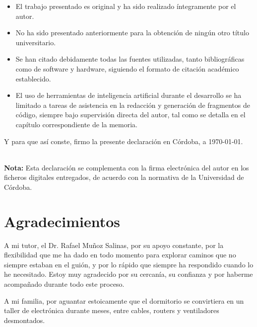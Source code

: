 \documentclass[12pt, a4paper, twoside, openright]{report}
\begin{document}
\begin{itemize}
    \item El trabajo presentado es original y ha sido realizado íntegramente por el autor.
    \item No ha sido presentado anteriormente para la obtención de ningún otro título universitario.
    \item Se han citado debidamente todas las fuentes utilizadas, tanto bibliográficas como de software y hardware, siguiendo el formato de citación académico establecido.
    \item El uso de herramientas de inteligencia artificial durante el desarrollo se ha limitado a tareas de asistencia en la redacción y generación de fragmentos de código, siempre bajo supervisión directa del autor, tal como se detalla en el capítulo correspondiente de la memoria.
\end{itemize}

\vspace{1.5cm}

\noindent Y para que así conste, firmo la presente declaración en Córdoba, a \today.\\[2cm]

\noindent\makebox[6cm]{\hrulefill}\\
\hspace*{0.5cm}{\footnotesize Fdo.: Jesús Fernández López}

\vspace{1cm}

\noindent\textbf{Nota:} Esta declaración se complementa con la firma electrónica del autor en los ficheros digitales entregados, de acuerdo con la normativa de la Universidad de Córdoba.

\cleardoublepage

\chapter*{Agradecimientos}
\label{ch:agradecimientos}

A mi tutor, el Dr. Rafael Muñoz Salinas, por su apoyo constante, por la flexibilidad que me ha dado en todo momento para explorar caminos que no siempre estaban en el guión, y por lo rápido que siempre ha respondido cuando lo he necesitado. Estoy muy agradecido por su cercanía, su confianza y por haberme acompañado durante todo este proceso.

A mi familia, por aguantar estoicamente que el dormitorio se convirtiera en un taller de electrónica durante meses, entre cables, routers y ventiladores desmontados.
\end{document}
